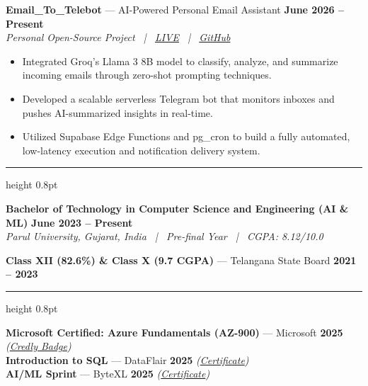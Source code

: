 \documentclass[10pt,a4paper]{article}
\newcommand{\resumesection}[1]{%
  \vspace{5pt}%
  \noindent{\large\textbf{#1}}\par
  \vspace{1pt}%
  \hrule height 0.8pt
  \vspace{3pt}%
}
\begin{document}
\vspace{3pt}

\noindent\textbf{Email\_To\_Telebot} --- AI-Powered Personal Email Assistant \hfill \textbf{June 2026 -- Present} \\
\textit{Personal Open-Source Project \ | \ \href{https://rahul-pamula.github.io/Email_to_telebot/}{LIVE} \ | \ \href{https://github.com/Rahul-pamula/Email_to_telebot}{GitHub}}
\begin{itemize}[leftmargin=1.2em, topsep=1pt, itemsep=0pt, parsep=0pt]
    \item Integrated Groq's Llama 3 8B model to classify, analyze, and summarize incoming emails through zero-shot prompting techniques.
    \item Developed a scalable serverless Telegram bot that monitors inboxes and pushes AI-summarized insights in real-time.
    \item Utilized Supabase Edge Functions and pg\_cron to build a fully automated, low-latency execution and notification delivery system.
\end{itemize}

\resumesection{EDUCATION}

\noindent\textbf{Bachelor of Technology in Computer Science and Engineering (AI \& ML)} \hfill \textbf{June 2023 -- Present} \\
\textit{Parul University, Gujarat, India \ | \ Pre-final Year \ | \ CGPA: 8.12/10.0}

\vspace{3pt}

\noindent\textbf{Class XII (82.6\%) \& Class X (9.7 CGPA)} --- Telangana State Board \hfill \textbf{2021 -- 2023}

\resumesection{CERTIFICATIONS}

\noindent\textbf{Microsoft Certified: Azure Fundamentals (AZ-900)} --- Microsoft \hfill \textbf{2025} \textit{(\href{https://www.credly.com/badges/cb01588f-556d-448d-84f3-aebeef100485/public_url}{Credly Badge})} \\
\noindent\textbf{Introduction to SQL} --- DataFlair \hfill \textbf{2025} \textit{(\href{https://drive.google.com/file/d/1oosWCwBwj4BE8eseplqIj-2Cx2dp42X3/view?usp=sharing}{Certificate})} \\
\noindent\textbf{AI/ML Sprint} --- ByteXL \hfill \textbf{2025} \textit{(\href{https://drive.google.com/file/d/1Didyx_p9tVhQ_uAG6CP7Sf4VfBXdAbES/view?usp=sharing}{Certificate})}
\end{document}
